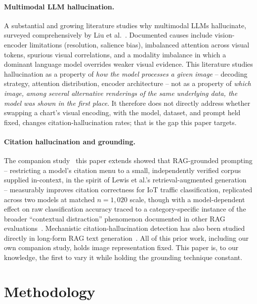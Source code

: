 \documentclass[11pt]{article}
\begin{document}
\paragraph{Multimodal LLM hallucination.} A substantial and growing literature studies why
multimodal LLMs hallucinate, surveyed comprehensively by Liu et al.~\cite{mllmhallucsurvey2024}.
Documented causes include vision-encoder limitations (resolution, salience bias), imbalanced
attention across visual tokens, spurious visual correlations, and a modality imbalance in which a
dominant language model overrides weaker visual evidence. This literature studies hallucination as
a property of \emph{how the model processes a given image} -- decoding strategy, attention
distribution, encoder architecture -- not as a property of \emph{which image, among several
alternative renderings of the same underlying data, the model was shown in the first place}. It
therefore does not directly address whether swapping a chart's visual encoding, with the model,
dataset, and prompt held fixed, changes citation-hallucination rates; that is the gap this paper
targets.

\paragraph{Citation hallucination and grounding.} The companion study~\cite{groundingcitation2026}
this paper extends showed that RAG-grounded prompting -- restricting a model's citation menu to a
small, independently verified corpus supplied in-context, in the spirit of
Lewis et al.'s retrieval-augmented generation~\cite{lewis2020retrieval} -- measurably improves
citation correctness for IoT traffic classification, replicated across two models at matched
$n=1{,}020$ scale, though with a model-dependent effect on raw classification accuracy traced to a
category-specific instance of the broader ``contextual distraction'' phenomenon documented in other
RAG evaluations~\cite{adaptivedistraction2025}. Mechanistic citation-hallucination detection has
also been studied directly in long-form RAG text generation~\cite{factum2026}. All of this prior
work, including our own companion study, holds image representation fixed. This paper is, to our
knowledge, the first to vary it while holding the grounding technique constant.

\section{Methodology}
\label{sec:methods}
\end{document}
